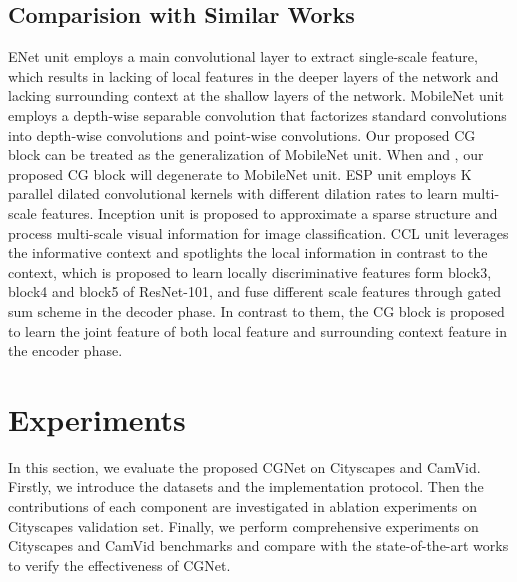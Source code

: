 \documentclass[10pt,twocolumn,letterpaper]{article}
\begin{document}
\subsection{Comparision with Similar Works}
ENet unit \cite{paszke2016enet} employs a main convolutional layer to extract single-scale feature, which results in lacking of local features in the deeper layers of the network and lacking surrounding context at the shallow layers of the network. MobileNet unit \cite{howard2017mobilenets} employs a depth-wise separable convolution that factorizes standard convolutions into depth-wise convolutions and point-wise convolutions. Our proposed CG block can be treated as the generalization of MobileNet unit. When  and , our proposed CG block will degenerate to MobileNet unit. ESP unit \cite{mehta2018espnet} employs K parallel dilated convolutional kernels with different dilation rates to learn multi-scale features. Inception unit \cite{szegedy2015going} is proposed to approximate a sparse structure and process multi-scale visual information for image classification. CCL unit \cite{Ding_2018_CVPR} leverages the informative context and spotlights the local information in contrast to the context, which is proposed to learn locally discriminative features form block3, block4 and block5 of ResNet-101, and fuse different scale features through gated sum scheme in the decoder phase. In contrast to them, the CG block is proposed to learn the joint feature of both local feature and surrounding context feature in the encoder phase.







\section{Experiments}
In this section, we evaluate the proposed CGNet on Cityscapes \cite{cordts2016cityscapes} and CamVid\cite{brostow2008segmentation}. Firstly, we introduce the datasets and the implementation protocol. Then the contributions of each component are investigated in ablation experiments on Cityscapes validation set. Finally, we perform comprehensive experiments on Cityscapes and CamVid benchmarks and compare with the state-of-the-art works to verify the effectiveness of CGNet.
\end{document}
